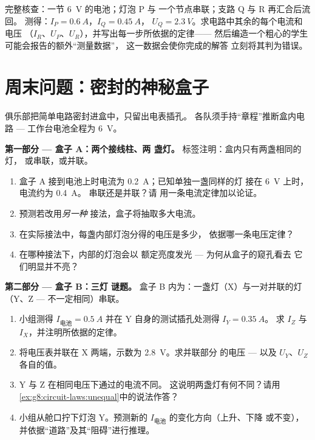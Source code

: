\begin{exercise}[$\star\star\star$]\label{exo:g8:circuit-laws:12}
完整核查：一节 \qty{6}{V} 的电池；灯泡 P 与
一个节点串联；支路 Q 与 R 再汇合后流回。
测得：$I_P = \qty{0.6}{A}$，$I_Q = \qty{0.45}{A}$，
$U_Q = \qty{2.3}{V}$。求电路中其余的每个电流和电压
（$I_R$、$U_P$、$U_R$），并写出每一步所依据的定律——
然后编造一个粗心的学生可能会报告的额外“测量数据”，
这一数据会使你完成的解答
立刻将其判为错误。
\end{exercise}

\section{周末问题：密封的神秘盒子}

\begin{problem}\label{pb:g8:circuit-laws:1}
俱乐部把简单电路密封进盒中，只留出电表插孔。
各队须手持“章程”推断盒内电路 ---
工作台电池全程为 \qty{6}{V}。

\medskip\noindent\textbf{第一部分 --- 盒子 A：两个接线柱、两
盏灯。}
标签注明：盒内只有两盏相同的灯，
或串联，或并联。
\begin{enumerate}
  \item 盒子 A 接到电池上时电流为 \qty{0.2}{A}；已知单独一盏同样的灯
        接在 \qty{6}{V} 上时，电流约为 \qty{0.4}{A}。
        串联还是并联？请
        用一条电流定律加以论证。
  \item 预测若改用\emph{另一种}
        接法，盒子将抽取多大电流。
  \item 在实际接法中，每盏内部灯泡分得的电压是多少，
        依据哪一条电压定律？
  \item 在哪种接法下，内部的灯泡会以
        额定亮度发光 --- 为何从盒子的窥孔看去
        它们明显并不亮？
\end{enumerate}

\medskip\noindent\textbf{第二部分 --- 盒子 B：三灯
谜题。}
盒子 B 内为：一盏灯（X）与一对并联的灯
（Y、Z --- 不一定相同）串联。
\begin{enumerate}[resume]
  \item 小组测得 $I_{\text{电池}} = \qty{0.5}{A}$
        并在 Y 自身的测试插孔处测得 $I_Y = \qty{0.35}{A}$。
        求 $I_Z$ 与 $I_X$，并注明所依据的定律。
  \item 将电压表并联在 X 两端，示数为 \qty{2.8}{V}。求并联部分
        的电压 --- 以及 $U_Y$、$U_Z$ 各自的值。
  \item Y 与 Z 在相同电压下通过的电流不同。
        这说明两盏灯有何不同？请用
        \cref{ex:g8:circuit-laws:unequal}中的说法作答？
  \item 小组从舱口拧下灯泡 Y。预测新的
        $I_{\text{电池}}$ 的变化方向（上升、下降
        或不变），并依据“道路”及其“阻碍”进行推理。
\end{enumerate}


\end{problem}
